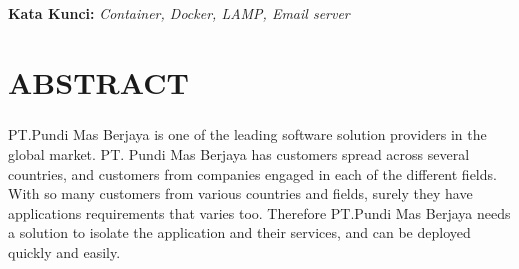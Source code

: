 \documentclass[../../SKRIPSI_ALDZIKRI_DWIJAYANTO_PRATHAMA.tex]{subfiles}
\begin{document}
%
%

\noindent
\textbf{Kata Kunci:} \textit{Container, Docker, LAMP, Email server}

\chapter*{ABSTRACT}\vspace*{2ex}

\paragraph*{} PT.Pundi Mas Berjaya is one of the leading software solution
providers in the global market. PT. Pundi Mas Berjaya has
customers spread across several countries, and customers
from companies engaged in each of the different fields. With
so many customers from various countries and fields, surely
they have applications requirements that varies too.
Therefore PT.Pundi Mas Berjaya needs a solution to isolate the application and their services, and can be deployed quickly
and easily.
\end{document}
